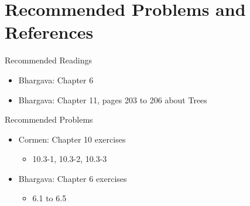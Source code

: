 \documentclass[
  ignorenonframetext,
]{beamer}
\providecommand{\tightlist}{%
  \setlength{\itemsep}{0pt}\setlength{\parskip}{0pt}}\usepackage{longtable,booktabs,array}
\begin{document}
\hypertarget{recommended-problems-and-references}{%
\section{Recommended Problems and
References}\label{recommended-problems-and-references}}

\begin{frame}{Recommended Readings}
\protect\hypertarget{recommended-readings}{}
\begin{itemize}
\item
  Bhargava: Chapter 6
\item
  Bhargava: Chapter 11, pages 203 to 206 about Trees
\end{itemize}
\end{frame}

\begin{frame}{Recommended Problems}
\protect\hypertarget{recommended-problems}{}
\begin{itemize}
\item
  Cormen: Chapter 10 exercises

  \begin{itemize}
  \tightlist
  \item
    10.3-1, 10.3-2, 10.3-3
  \end{itemize}
\item
  Bhargava: Chapter 6 exercises

  \begin{itemize}
  \tightlist
  \item
    6.1 to 6.5
  \end{itemize}
\end{itemize}
\end{frame}
\end{document}
